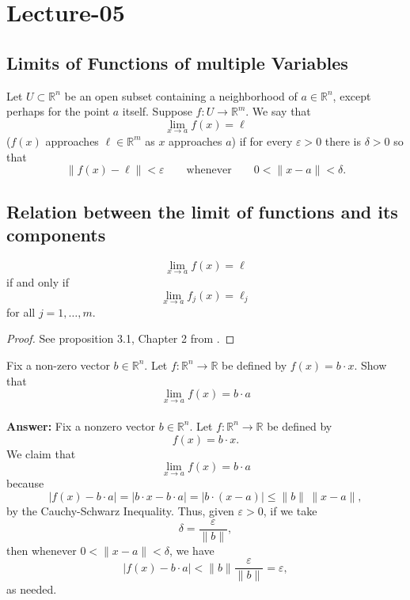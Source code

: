 \newpage
\section{Lecture-05}
\subsection{Limits of Functions of multiple Variables}
\begin{definition}
Let $U \subset \mathbb{R}^n$ be an open subset containing a neighborhood of
$a \in \mathbb{R}^n$, except perhaps for the point $a$ itself.
Suppose $f:U \to \mathbb{R}^m$. We say that
\[
    \lim_{x\to a} f(x)=\ell
\]
($f(x)$ approaches $\ell \in \mathbb{R}^m$ as $x$ approaches $a$) if for every
$\varepsilon>0$ there is $\delta>0$ so that
\[
    \|f(x)-\ell\|<\varepsilon
    \qquad\text{whenever}\qquad
    0<\|x-a\|<\delta.
\]
\end{definition}
\subsection{Relation between the limit of functions and its components}
\begin{proposition}
$$\lim_{x\to a} f(x)=\ell$$ if and only if
$$\lim_{x\to a} f_j(x)=\ell_j$$ for all $j=1,\ldots,m$.
\end{proposition}    
\begin{proof}
    See proposition 3.1, Chapter 2 from \cite{shifrin}.
\end{proof}
\begin{example}
Fix a non-zero vector $b\in\mathbb R^n$. Let $f:\mathbb R^n\rightarrow\mathbb R$ be defined by $f(x)=b\cdot x$. Show that $$\lim_{x\to a} f(x)=b\cdot a$$\\
\textbf{Answer: }Fix a nonzero vector $b \in \mathbb{R}^n$. Let $f : \mathbb{R}^n \to \mathbb{R}$ be defined by
\[
f(x)= b \cdot x.
\]
We claim that
\[
\lim_{x \to a} f(x) = b \cdot a
\]
because
\[
|f(x)-b\cdot a|
= |b\cdot x - b\cdot a|
= |b\cdot (x-a)|
\leq \|b\|\,\|x-a\|,
\]
by the Cauchy-Schwarz Inequality. Thus, given
$\varepsilon > 0$, if we take
\[
\delta = \frac{\varepsilon}{\|b\|},
\]
then whenever $0 < \|x-a\| < \delta$, we have
\[
|f(x)-b\cdot a| < \|b\| \frac{\varepsilon}{\|b\|} = \varepsilon,
\]
as needed.

\end{example}

